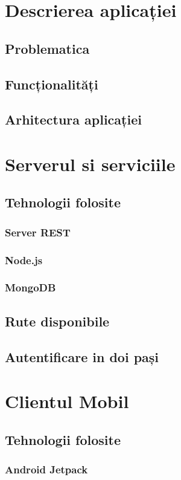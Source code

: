 \documentclass[a4paper]{article}
\begin{document}
\section{Descrierea aplicației}
\subsection{Problematica}
\subsection{Funcționalități}
\subsection{Arhitectura aplicației}

\section{Serverul si serviciile}
\subsection{Tehnologii folosite}
\subsubsection{Server REST}
\subsubsection{Node.js}
\subsubsection{MongoDB}
\subsection{Rute disponibile}
\subsection{Autentificare in doi pași}

\section{Clientul Mobil}
\subsection{Tehnologii folosite}
\subsubsection{Android Jetpack}
\end{document}
